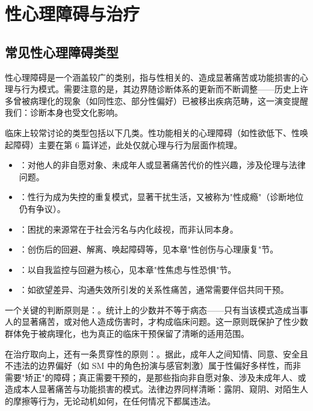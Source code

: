 \section{性心理障碍与治疗}
\subsection{常见性心理障碍类型}

性心理障碍是一个涵盖较广的类别，指与性相关的、造成显著痛苦或功能损害的心理与行为模式。需要注意的是，其边界随诊断体系的更新而不断调整——历史上许多曾被病理化的现象（如同性恋、部分性偏好）已被移出疾病范畴，这一演变提醒我们：诊断本身也受文化影响。

临床上较常讨论的类型包括以下几类。性功能相关的心理障碍（如性欲低下、性唤起障碍）主要在第 6 篇详述，此处仅就心理与行为层面作梳理。

\begin{itemize}
  \item {}：对他人的非自愿对象、未成年人或显著痛苦代价的性兴趣，涉及伦理与法律问题。
  \item {}：性行为成为失控的重复模式，显著干扰生活，又被称为"性成瘾"（诊断地位仍有争议）。
  \item {}：困扰的来源常在于社会污名与内化歧视，而非认同本身。
  \item {}：创伤后的回避、解离、唤起障碍等，见本章"性创伤与心理康复"节。
  \item {}：以自我监控与回避为核心，见本章"性焦虑与性恐惧"节。
  \item {}：如欲望差异、沟通失效所引发的关系性痛苦，通常需要伴侣共同干预。
\end{itemize}

一个关键的判断原则是：。统计上的少数并不等于病态——只有当该模式造成当事人的显著痛苦，或对他人造成伤害时，才构成临床问题。这一原则既保护了性少数群体免于被病理化，也为真正的临床干预保留了清晰的适用范围。

在治疗取向上，还有一条贯穿性的原则：。据此，成年人之间知情、同意、安全且不违法的边界偏好（如 SM 中的角色扮演与感官刺激）属于性偏好多样性，而非需要"矫正"的障碍；真正需要干预的，是那些指向非自愿对象、涉及未成年人、或造成本人显著痛苦与功能损害的模式。法律边界同样清晰：露阴、窥阴、对陌生人的摩擦等行为，无论动机如何，在任何情况下都属违法。

